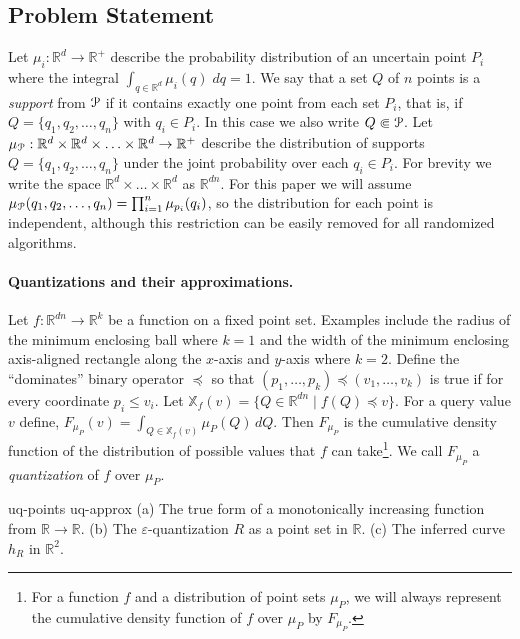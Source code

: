 \documentclass{journal}
\newcommand{\eps}{\varepsilon}
\newcommand{\Eu}[1]{\ensuremath{\EuScript{#1}}}
\renewcommand{\b}[1]{\ensuremath{\mathbb{#1}}}
\newcommand{\R}{\ensuremath{\mathbb{R}}}
\newcommand{\pset}{support\xspace}
\begin{document}
\subsection{Problem Statement}  
Let $\mu_i : \R^d \to \R^+$ describe the probability distribution of an uncertain point $P_i$ where the integral $\int_{q \in \R^d} \mu_i(q) \; dq = 1$.
We say that a set $Q$ of $n$ points is a \emph {\pset} from $\Eu P$ if it contains exactly one point from each set $P_i$, that is, if $Q = \{q_1, q_2, \ldots, q_n\}$ with $q_i \in P_i$.
In this case we also write $Q \Subset \Eu P$.
Let $\mu_{\Eu{P}} : \R^d \times \R^d \times \ldots \times \R^d \to \R^+$ describe the distribution of supports $Q = \{q_1, q_2, \ldots, q_n\}$ under the joint probability over each $q_i \in P_i$.
For brevity we write the space $\R^d \times \ldots \times \R^d$ as $\R^{dn}$.
For this paper we will assume $\mu_{\Eu{P}}(q_1, q_2, \ldots, q_n) = \prod_{i=1}^n \mu_{p_i}(q_i)$, so the distribution for each point is independent, although  this restriction can be easily removed for all randomized algorithms.



\paragraph{Quantizations and their approximations.}
Let $f : \R^{dn} \to \R^k$ be a function on a fixed point set.  Examples include the radius of the minimum enclosing ball where $k=1$ and the width of the minimum enclosing axis-aligned rectangle along the $x$-axis and $y$-axis where $k=2$.
Define the ``dominates'' binary operator $\preceq$ so that $(p_1, \ldots, p_k) \preceq (v_1, \ldots, v_k)$ is true if for every coordinate $p_i \leq v_i$.
Let $\b{X}_f(v) = \{Q \in \R^{dn} \mid f(Q) \preceq v\}$.
For a query value $v$ define,
$
F_{\mu_P}(v) = \int_{Q \in \b{X}_f(v)} \mu_P(Q) \, dQ.
$
Then $F_{\mu_P}$ is the cumulative density function of the distribution of possible values that $f$ can take\footnote{For a function $f$ and a distribution of point sets $\mu_P$, we will always represent the cumulative density function of $f$ over $\mu_P$ by $F_{\mu_P}$.
}.  We call $F_{\mu_P}$ a \emph{quantization} of $f$ over $\mu_P$.  

 {uq-points} {uq-approx}
{ \label{fig:1e-quants}
  (a) The true form of a monotonically increasing function from $\R \to \R$.
  (b) The $\eps$-quantization $R$ as a point set in $\R$.  
  (c) The inferred curve $h_R$ in $\R^2$.
}
\end{document}
